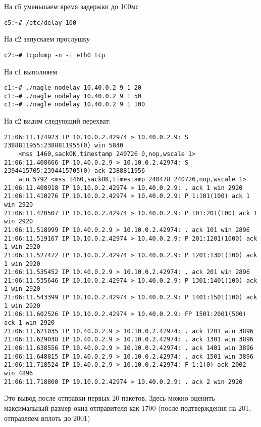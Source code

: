 \documentclass[a4paper,12pt]{article}
\begin{document}
На с5 уменьшаем время задержки до 100мс

\begin{Verbatim}
c5:~# /etc/delay 100
\end{Verbatim}

На с2 запускаем прослушку

\begin{Verbatim}
c2:~# tcpdump -n -i eth0 tcp
\end{Verbatim}

На с1 выполняем
\begin{Verbatim}
c1:~# ./nagle nodelay 10.40.0.2 9 1 20
c1:~# ./nagle nodelay 10.40.0.2 9 1 50
c1:~# ./nagle nodelay 10.40.0.2 9 1 100
\end{Verbatim}

На с2 видим следующий перехват:
\begin{Verbatim}
21:06:11.174923 IP 10.10.0.2.42974 > 10.40.0.2.9: S 2388811955:2388811955(0) win 5840 
	<mss 1460,sackOK,timestamp 240726 0,nop,wscale 1>
21:06:11.408666 IP 10.40.0.2.9 > 10.10.0.2.42974: S 2394415705:2394415705(0) ack 2388811956 
	win 5792 <mss 1460,sackOK,timestamp 240478 240726,nop,wscale 1>
21:06:11.408918 IP 10.10.0.2.42974 > 10.40.0.2.9: . ack 1 win 2920 
21:06:11.410276 IP 10.10.0.2.42974 > 10.40.0.2.9: P 1:101(100) ack 1 win 2920 
21:06:11.420507 IP 10.10.0.2.42974 > 10.40.0.2.9: P 101:201(100) ack 1 win 2920 
21:06:11.518999 IP 10.40.0.2.9 > 10.10.0.2.42974: . ack 101 win 2896 
21:06:11.519167 IP 10.10.0.2.42974 > 10.40.0.2.9: P 201:1201(1000) ack 1 win 2920 
21:06:11.527472 IP 10.10.0.2.42974 > 10.40.0.2.9: P 1201:1301(100) ack 1 win 2920 
21:06:11.535452 IP 10.40.0.2.9 > 10.10.0.2.42974: . ack 201 win 2896 
21:06:11.535646 IP 10.10.0.2.42974 > 10.40.0.2.9: P 1301:1401(100) ack 1 win 2920 
21:06:11.543399 IP 10.10.0.2.42974 > 10.40.0.2.9: P 1401:1501(100) ack 1 win 2920 
21:06:11.602526 IP 10.10.0.2.42974 > 10.40.0.2.9: FP 1501:2001(500) ack 1 win 2920 
21:06:11.621035 IP 10.40.0.2.9 > 10.10.0.2.42974: . ack 1201 win 3896 
21:06:11.629038 IP 10.40.0.2.9 > 10.10.0.2.42974: . ack 1301 win 3896 
21:06:11.638556 IP 10.40.0.2.9 > 10.10.0.2.42974: . ack 1401 win 3896 
21:06:11.648815 IP 10.40.0.2.9 > 10.10.0.2.42974: . ack 1501 win 3896 
21:06:11.718524 IP 10.40.0.2.9 > 10.10.0.2.42974: F 1:1(0) ack 2002 win 4896 
21:06:11.718800 IP 10.10.0.2.42974 > 10.40.0.2.9: . ack 2 win 2920 
\end{Verbatim}
Это вывод после отправки первых 20 пакетов. Здесь можно оценить максимальный размер окна отправителя как 1700 (после подтверждения на 201, отправляем вплоть до 2001)
\end{document}
